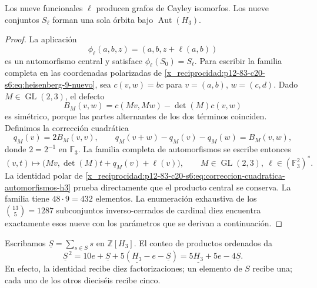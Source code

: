 \begin{theorem}
\label{x_reciprocidad:p12-83-c20-s6:thm:independencia-calibre-e6}
Los nueve funcionales \(\ell\) producen grafos de Cayley isomorfos. Los
nueve conjuntos \(S_\ell\) forman una sola órbita bajo
\(\operatorname{Aut}(H_3)\).
\end{theorem}

\begin{proof}
La aplicación
\[
 \phi_\ell(a,b,z)=(a,b,z+\ell(a,b))
\]
es un automorfismo central y satisface
\(\phi_\ell(S_0)=S_\ell\). Para escribir la familia completa en las
coordenadas polarizadas de \cref{x_reciprocidad:p12-83-c20-s6:eq:heisenberg-9-nuevo}, sea
\(c(v,w)=b c\) para \(v=(a,b)\), \(w=(c,d)\). Dado
\(M\in\operatorname{GL}(2,3)\), el defecto
\[
 B_M(v,w)=c(Mv,Mw)-\det(M)c(v,w)
\]
es simétrico, porque las partes alternantes de los dos términos coinciden.
Definimos la corrección cuadrática
\begin{equation}
 q_M(v)=2B_M(v,v),
 \qquad
 q_M(v+w)-q_M(v)-q_M(w)=B_M(v,w),
 \label{x_reciprocidad:p12-83-c20-s6:eq:correccion-cuadratica-automorfismos-h3}
\end{equation}
donde \(2=2^{-1}\) en \(\mathbb F_3\). La familia completa de
automorfismos se escribe entonces
\begin{equation}
 (v,t)\longmapsto
 \bigl(Mv,\det(M)t+q_M(v)+\ell(v)\bigr),
 \qquad M\in\operatorname{GL}(2,3),\
 \ell\in(\mathbb F_3^2)^*.
 \label{x_reciprocidad:p12-83-c20-s6:eq:automorfismos-h3-completos}
\end{equation}
La identidad polar de \cref{x_reciprocidad:p12-83-c20-s6:eq:correccion-cuadratica-automorfismos-h3}
prueba directamente que el producto central se conserva. La familia tiene
\(48\cdot9=432\) elementos. La enumeración exhaustiva de los
\(\binom{13}{5}=1287\) subconjuntos inverso-cerrados de cardinal diez
encuentra exactamente esos nueve con los parámetros que se derivan a
continuación.
\end{proof}

Escribamos \(\underline S=\sum_{s\in S}s\) en
\(\mathbb Z[H_3]\). El conteo de productos ordenados da
\begin{equation}
 \underline S^{\,2}
 =10e+\underline S+5(\underline{H_3}-e-\underline S)
 =5\underline{H_3}+5e-4\underline S.
 \label{x_reciprocidad:p12-83-c20-s6:eq:identidad-grupo-schlafli-nueva}
\end{equation}
En efecto, la identidad recibe diez factorizaciones; un elemento de
\(S\) recibe una; cada uno de los otros dieciséis recibe cinco.

